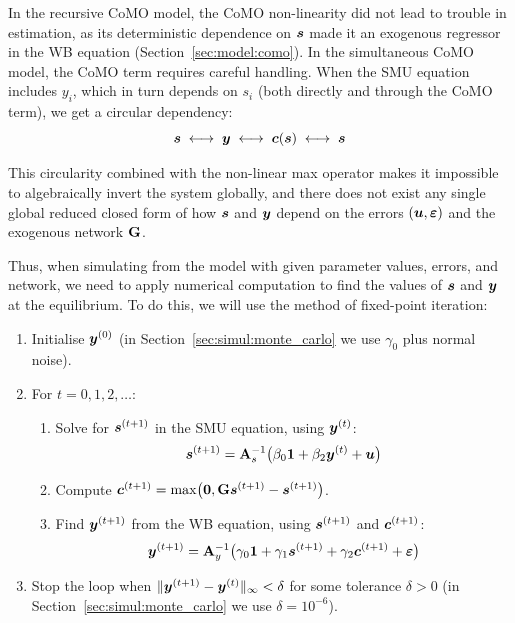 In the recursive CoMO model, the CoMO non-linearity did not lead to trouble in estimation, as its deterministic dependence on $\bm{s}$ made it an exogenous regressor in the WB equation (Section~\ref{sec:model:como}). In the simultaneous CoMO model, the CoMO term requires careful handling. When the SMU equation includes $y_i$, which in turn depends on $s_i$ (both directly and through the CoMO term), we get a circular dependency:
\begin{equation}
    \bm{s} \;\longleftrightarrow\; \bm{y} \;\longleftrightarrow\; \bm{c}(\bm{s}) \;\longleftrightarrow\; \bm{s}
\end{equation}

This circularity combined with the non-linear max operator makes it impossible to algebraically invert the system globally, and there does not exist any single global reduced closed form of how $\bm{s}$ and $\bm{y}$ depend on the errors $(\bm{u}, \bm{\varepsilon})$ and the exogenous network $\mathbf{G}$.

Thus, when simulating from the model with given parameter values, errors, and network, we need to apply numerical computation to find the values of $\bm{s}$ and $\bm{y}$ at the equilibrium. To do this, we will use the method of fixed-point iteration:

\begin{enumerate}
    \item Initialise $\bm{y}^{(0)}$ (in Section~\ref{sec:simul:monte_carlo} we use $\gamma_0$ plus normal noise).
    \item For $t = 0, 1, 2, \ldots$:
    \begin{enumerate}
        \item Solve for $\bm{s}^{(t+1)}$ in the SMU equation, using $\bm{y}^{(t)}$:
        \begin{equation}
            \bm{s}^{(t+1)} = \mathbf{A}_s^{-1}\bigl(\beta_0\bm{1} + \beta_2\bm{y}^{(t)} + \bm{u}\bigr)
        \end{equation}
        \item Compute $\bm{c}^{(t+1)} = \max\bigl(\bm{0}, \mathbf{G}\bm{s}^{(t+1)} - \bm{s}^{(t+1)}\bigr)$.
        \item Find $\bm{y}^{(t+1)}$ from the WB equation, using $\bm{s}^{(t+1)}$ and $\bm{c}^{(t+1)}$:
        \begin{equation}
            \bm{y}^{(t+1)} = \mathbf{A}_y^{-1}\bigl(\gamma_0\bm{1} + \gamma_1\bm{s}^{(t+1)} + \gamma_2\bm{c}^{(t+1)} + \bm{\varepsilon}\bigr)
        \end{equation}
    \end{enumerate}
    \item Stop the loop when $\|\bm{y}^{(t+1)} - \bm{y}^{(t)}\|_\infty < \delta$ for some tolerance $\delta > 0$ (in Section~\ref{sec:simul:monte_carlo} we use $\delta = 10^{-6}$).
\end{enumerate}

